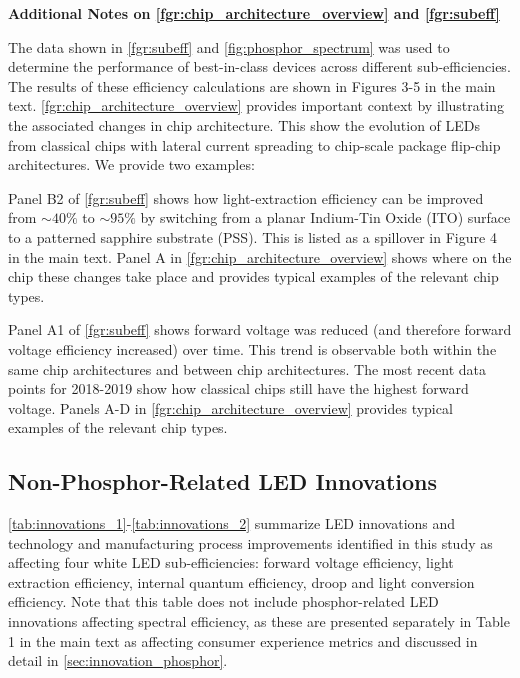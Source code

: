 \documentclass[parskip=full]{article}
\begin{document}
\textbf{Additional Notes on \cref{fgr:chip_architecture_overview} and \cref{fgr:subeff}}

The data shown in \cref{fgr:subeff} and \cref{fig:phosphor_spectrum} was used to determine the performance of best-in-class devices across different sub-efficiencies. The results of these efficiency calculations are shown in Figures 3-5 in the main text. \cref{fgr:chip_architecture_overview} provides important context by illustrating the associated changes in chip architecture. This show the evolution of LEDs from classical chips with lateral current spreading to chip-scale package flip-chip architectures. We provide two examples:

Panel B2 of \cref{fgr:subeff} shows how light-extraction efficiency can be improved from $\sim40\%$ to $\sim95\%$ by switching from a planar Indium-Tin Oxide (ITO) surface to a patterned sapphire substrate (PSS). This is listed as a spillover in Figure 4 in the main text. Panel A in \cref{fgr:chip_architecture_overview} shows where on the chip these changes take place and provides typical examples of the relevant chip types.

Panel A1 of \cref{fgr:subeff} shows forward voltage was reduced (and therefore forward voltage efficiency increased) over time. This trend is observable both within the same chip architectures and between chip architectures. The most recent data points for 2018-2019 show how classical chips still have the highest forward voltage. Panels A-D in \cref{fgr:chip_architecture_overview} provides typical examples of the relevant chip types.

\clearpage
\subsection{Non-Phosphor-Related LED Innovations}

\cref{tab:innovations_1}-\cref{tab:innovations_2} summarize LED innovations and technology and manufacturing process improvements identified in this study as affecting four white LED sub-efficiencies: forward voltage efficiency, light extraction efficiency, internal quantum efficiency, droop and light conversion efficiency. Note that this table does not include phosphor-related LED innovations affecting spectral efficiency, as these are presented separately in Table 1 in the main text as affecting consumer experience metrics and discussed in detail in \cref{sec:innovation_phosphor}.
\end{document}
